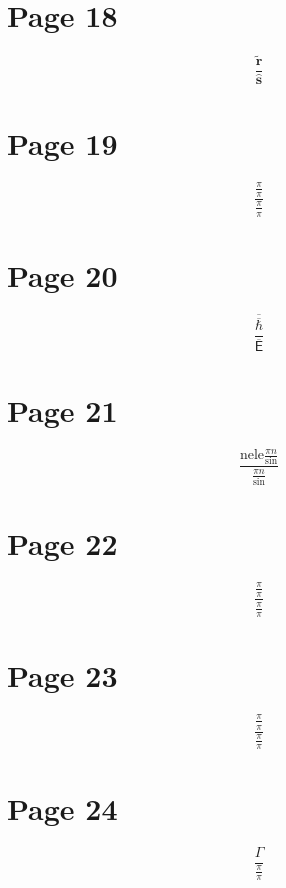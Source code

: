 \documentclass{article}
\begin{document}
\section{Page 18}
\begin{equation}
\frac{\tilde{\mathbf{r}}}{\hat{\mathbf{s}}}
\end{equation}

\section{Page 19}
\begin{equation}
\frac{\frac{\pi}{\pi}}{\frac{\pi}{\pi}}
\end{equation}

\section{Page 20}
\begin{equation}
\frac{\overline{{\overline{{\hbar}}}}}{\overline{{\mathsf{E}}}}
\end{equation}

\section{Page 21}
\begin{equation}
\frac{{\mathrm{nele}}{\frac{\pi n}{\sin}}}{\frac{\pi n}{\sin}}
\end{equation}

\section{Page 22}
\begin{equation}
\frac{\frac{\pi}{\pi}}{\frac{\pi}{\pi}}
\end{equation}

\section{Page 23}
\begin{equation}
\frac{\frac{\pi}{\pi}}{\frac{\pi}{\pi}}
\end{equation}

\section{Page 24}
\begin{equation}
\frac{\Gamma}{\frac{\pi}{\pi}}
\end{equation}
\end{document}
